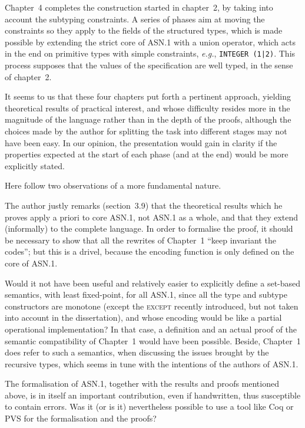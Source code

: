 \documentclass[a4paper,11pt,twoside]{article}
\begin{document}
Chapter~4 completes the construction started in chapter~2, by taking
into account the subtyping constraints. A series of phases aim at
moving the constraints so they apply to the fields of the structured
types, which is made possible by extending the strict core of ASN.1
with a union operator, which acts in the end on primitive types with
simple constraints, \emph{e.g.}, \texttt{INTEGER (1|2)}. This process
supposes that the values of the specification are well typed, in the
sense of chapter~2.

It seems to us that these four chapters put forth a pertinent
approach, yielding theoretical results of practical interest, and
whose difficulty resides more in the magnitude of the language rather
than in the depth of the proofs, although the choices made by the
author for splitting the task into different stages may not have been
easy. In our opinion, the presentation would gain in clarity if the
properties expected at the start of each phase (and at the end) would
be more explicitly stated.

Here follow two observations of a more fundamental nature.

The author justly remarks (section~3.9) that the theoretical results
which he proves apply a priori to core ASN.1, not ASN.1 as a whole,
and that they extend (informally) to the complete language. In order
to formalise the proof, it should be necessary to show that all the
rewrites of Chapter~1 ``keep invariant the codes''; but this is a
drivel, because the encoding function is only defined on the core of
ASN.1.

Would it not have been useful and relatively easier to explicitly
define a set\hyp{}based semantics, with least fixed\hyp{}point, for
all ASN.1, since all the type and subtype constructors are monotone
(except the \textsc{except} recently introduced, but not taken into
account in the dissertation), and whose encoding would be like a
partial operational implementation? In that case, a definition and an
actual proof of the semantic compatibility of Chapter~1 would have
been possible. Beside, Chapter~1 does refer to such a semantics, when
discussing the issues brought by the recursive types, which seems in
tune with the intentions of the authors of ASN.1.

The formalisation of ASN.1, together with the results and proofs
mentioned above, is in itself an important contribution, even if
handwritten, thus susceptible to contain errors. Was it (or is it)
nevertheless possible to use a tool like Coq or PVS for the
formalisation and the proofs?
\end{document}
